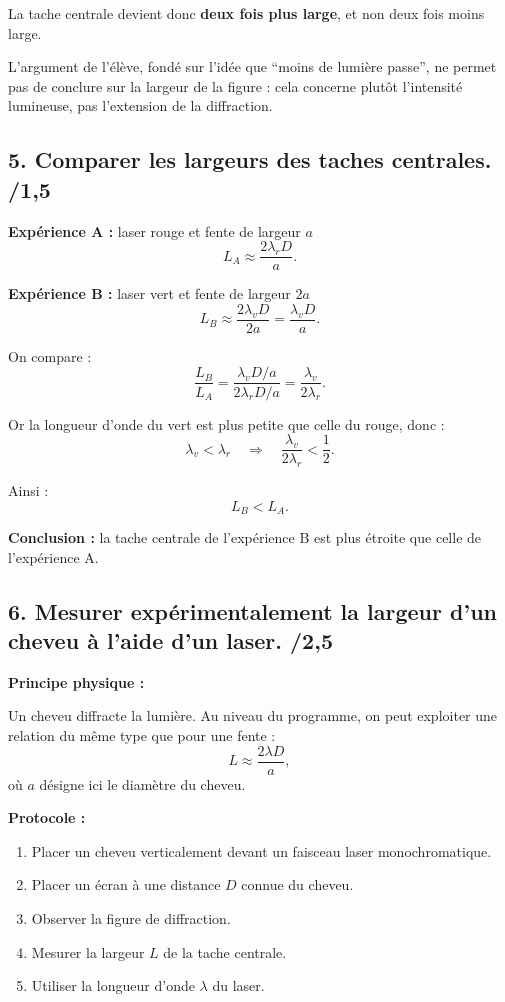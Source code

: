 \documentclass[11pt,a4paper]{article}
\begin{document}
La tache centrale devient donc \textbf{deux fois plus large}, et non deux fois moins large.

L'argument de l'élève, fondé sur l'idée que ``moins de lumière passe'', ne permet pas de conclure sur la largeur de la figure : cela concerne plutôt l'intensité lumineuse, pas l'extension de la diffraction.

\subsection*{5. Comparer les largeurs des taches centrales. \hfill /1{,}5}

\textbf{Expérience A :} laser rouge et fente de largeur \(a\)
\[
L_A \approx \frac{2\lambda_r D}{a}.
\]

\textbf{Expérience B :} laser vert et fente de largeur \(2a\)
\[
L_B \approx \frac{2\lambda_v D}{2a} = \frac{\lambda_v D}{a}.
\]

On compare :
\[
\frac{L_B}{L_A} = \frac{\lambda_v D/a}{2\lambda_r D/a} = \frac{\lambda_v}{2\lambda_r}.
\]

Or la longueur d'onde du vert est plus petite que celle du rouge, donc :
\[
\lambda_v < \lambda_r \quad \Rightarrow \quad \frac{\lambda_v}{2\lambda_r} < \frac{1}{2}.
\]

Ainsi :
\[
L_B < L_A.
\]

\textbf{Conclusion :} la tache centrale de l'expérience B est plus étroite que celle de l'expérience A.

\subsection*{6. Mesurer expérimentalement la largeur d'un cheveu à l'aide d'un laser. \hfill /2{,}5}

\textbf{Principe physique :}

Un cheveu diffracte la lumière. Au niveau du programme, on peut exploiter une relation du même type que pour une fente :
\[
L \approx \frac{2\lambda D}{a},
\]
où \(a\) désigne ici le diamètre du cheveu.

\textbf{Protocole :}
\begin{enumerate}[label=\arabic*.]
    \item Placer un cheveu verticalement devant un faisceau laser monochromatique.
    \item Placer un écran à une distance \(D\) connue du cheveu.
    \item Observer la figure de diffraction.
    \item Mesurer la largeur \(L\) de la tache centrale.
    \item Utiliser la longueur d'onde \(\lambda\) du laser.
\end{enumerate}
\end{document}
